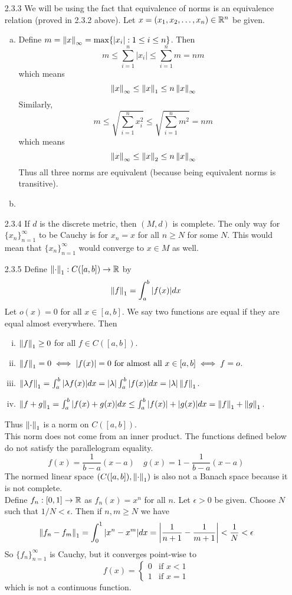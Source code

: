 \documentclass[../../Solutions.tex]{subfiles}
\begin{document}
\begin{itemize}
	\item [2.3.3] We will be using the fact that equivalence of norms is an equivalence relation (proved in 2.3.2 above).
		Let $x = (x_1,x_2,\dots,x_n) \in \mathbb{R}^n$ be given.
		\begin{enumerate}[(a)]
			\item Define $m = \left\lVert x\right\rVert_\infty = \max\{|x_i| : 1 \leq i \leq n\}$.
				Then
				$$ m \leq \sum_{i=1}^n |x_i| \leq \sum_{i=1}^n m = n m $$
				which means
				$$ \left\lVert x\right\rVert_\infty \leq \left\lVert x\right\rVert_1 \leq n\left\lVert x\right\rVert_\infty $$
				Similarly,
				$$ m \leq \sqrt{\sum_{i=1}^n x_i^2} \leq \sqrt{\sum_{i=1}^n m^2} = n m $$
				which means
				$$ \left\lVert x\right\rVert_\infty \leq \left\lVert x\right\rVert_2 \leq n\left\lVert x\right\rVert_\infty $$
				Thus all three norms are equivalent (because being equivalent norms is transitive).
			\item %
		\end{enumerate}
	
	\item [2.3.4] If $d$ is the discrete metric, then $(M,d)$ is complete.
		The only way for $\{x_n\}_{n=1}^\infty$ to be Cauchy is for $x_n = x$ for all $n \geq N$ for some $N$.
		This would mean that $\{x_n\}_{n=1}^\infty$ would converge to $x \in M$ as well.
	
	\item [2.3.5] Define $\left\lVert\cdot\right\rVert_1 : C([a,b]) \to \mathbb{R}$ by
		$$ \left\lVert f\right\rVert_1 = \int_a^b |f(x)| dx $$
		Let $o(x) = 0$ for all $x \in [a,b]$.
		We say two functions are equal if they are equal almost everywhere.
		Then
		\begin{enumerate}[(i)]
			\item $\left\lVert f\right\rVert_1 \geq 0$ for all $f \in C([a,b])$.
			\item $\left\lVert f\right\rVert_1 = 0 \iff |f(x)| = 0 \text{ for almost all } x \in [a,b] \iff f = o$.
			\item $\left\lVert\lambda f\right\rVert_1 = \int_a^b |\lambda f(x)| dx = |\lambda|\int_a^b|f(x)|dx = |\lambda|\left\lVert f\right\rVert_1$.
			\item $\left\lVert f+g\right\rVert_1 = \int_a^b |f(x)+g(x)|dx \leq \int_a^b|f(x)|+|g(x)|dx = \left\lVert f\right\rVert_1+\left\lVert g\right\rVert_1$.
		\end{enumerate}
		Thus $\left\lVert\cdot\right\rVert_1$ is a norm on $C([a,b])$. \\
		This norm does not come from an inner product.
		The functions defined below do not satisfy the parallelogram equality.
		$$ f(x) = \frac{1}{b-a}(x-a) \quad g(x) = 1-\frac{1}{b-a}(x-a) $$
		The normed linear space $(C([a,b]),\left\lVert\cdot\right\rVert_1)$ is also not a Banach space because it is not complete. \\
		Define $f_n:[0,1] \to \mathbb{R}$ as $f_n(x) = x^n$ for all $n$.
		Let $\epsilon > 0$ be given.
		Choose $N$ such that $1/N < \epsilon$.
		Then if $n,m \geq N$ we have
		$$ \left\lVert f_n-f_m\right\rVert_1 = \int_0^1|x^n-x^m|dx = \left|\frac{1}{n+1}-\frac{1}{m+1}\right| < \frac{1}{N} < \epsilon $$
		So $\{f_n\}_{n=1}^\infty$ is Cauchy, but it converges point-wise to
		$$ f(x) = \begin{cases}
			0 & \text{if } x < 1 \\
			1 & \text{if } x = 1
		\end{cases} $$
		which is not a continuous function.
	

\end{itemize}
\end{document}
